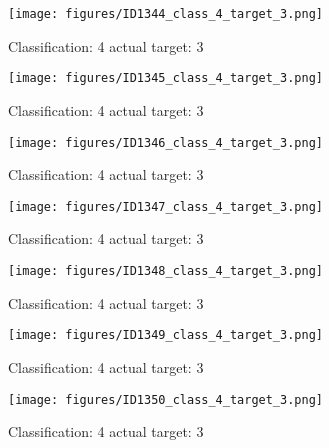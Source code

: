 \begin{figure}[h!]
\begin{center}
\texttt{[image: figures/ID1344\_class\_4\_target\_3.png]}
\end{center}
\caption{ Classification: 4 actual target: 3}
\label{fig:ID1344_class_4_target_3}
\end{figure}
\begin{figure}[h!]
\begin{center}
\texttt{[image: figures/ID1345\_class\_4\_target\_3.png]}
\end{center}
\caption{ Classification: 4 actual target: 3}
\label{fig:ID1345_class_4_target_3}
\end{figure}
\begin{figure}[h!]
\begin{center}
\texttt{[image: figures/ID1346\_class\_4\_target\_3.png]}
\end{center}
\caption{ Classification: 4 actual target: 3}
\label{fig:ID1346_class_4_target_3}
\end{figure}
\begin{figure}[h!]
\begin{center}
\texttt{[image: figures/ID1347\_class\_4\_target\_3.png]}
\end{center}
\caption{ Classification: 4 actual target: 3}
\label{fig:ID1347_class_4_target_3}
\end{figure}
\begin{figure}[h!]
\begin{center}
\texttt{[image: figures/ID1348\_class\_4\_target\_3.png]}
\end{center}
\caption{ Classification: 4 actual target: 3}
\label{fig:ID1348_class_4_target_3}
\end{figure}
\begin{figure}[h!]
\begin{center}
\texttt{[image: figures/ID1349\_class\_4\_target\_3.png]}
\end{center}
\caption{ Classification: 4 actual target: 3}
\label{fig:ID1349_class_4_target_3}
\end{figure}
\begin{figure}[h!]
\begin{center}
\texttt{[image: figures/ID1350\_class\_4\_target\_3.png]}
\end{center}
\caption{ Classification: 4 actual target: 3}
\label{fig:ID1350_class_4_target_3}
\end{figure}
